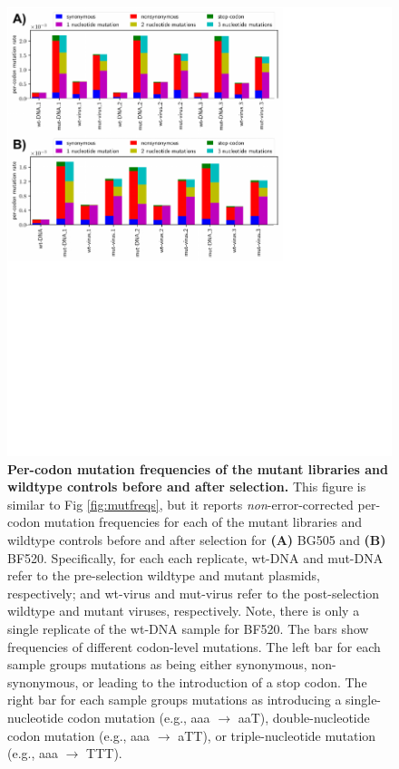 \documentclass[9pt,lineno]{elife}
\begin{document}
\begin{figure}
\centerline{\includegraphics[width=5in]{figures/mutfreqs_supp/mutfreqs_supp}}
\caption{\label{suppfig:mutfreqs_supp}
{\bf Per-codon mutation frequencies of the mutant libraries and wildtype controls before and after selection.}
This figure is similar to Fig \ref{fig:mutfreqs}, but it reports \textit{non}-error-corrected per-codon mutation frequencies for each of the mutant libraries and wildtype controls before and after selection for {\bf (A)} BG505 and {\bf (B)} BF520.
Specifically, for each each replicate, wt-DNA and mut-DNA refer to the pre-selection wildtype and mutant plasmids, respectively; and wt-virus and mut-virus refer to the post-selection wildtype and mutant viruses, respectively.
Note, there is only a single replicate of the wt-DNA sample for BF520.
The bars show frequencies of different codon-level mutations.
The left bar for each sample groups mutations as being either synonymous, non-synonymous, or leading to the introduction of a stop codon.
The right bar for each sample groups mutations as introducing a single-nucleotide codon mutation (e.g., aaa $\rightarrow$ aaT), double-nucleotide codon mutation (e.g., aaa $\rightarrow$ aTT), or triple-nucleotide mutation (e.g., aaa $\rightarrow$ TTT).
}
\end{figure}
\end{document}
